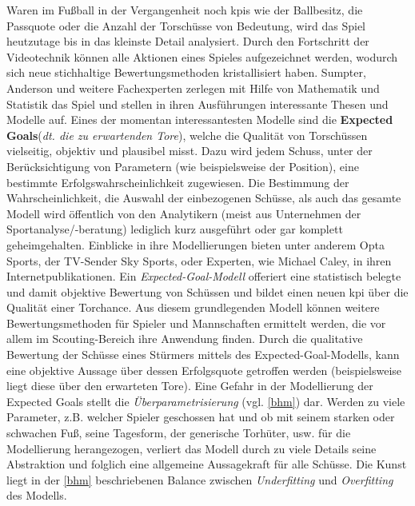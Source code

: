 Waren im Fußball in der Vergangenheit noch \glspl{kpi} wie der Ballbesitz, die Passquote oder die Anzahl der Torschüsse von Bedeutung, wird das Spiel heutzutage bis in das kleinste Detail analysiert. Durch den Fortschritt der Videotechnik können alle Aktionen eines Spieles aufgezeichnet werden, wodurch sich neue stichhaltige Bewertungsmethoden kristallisiert haben. Sumpter, Anderson und weitere Fachexperten zerlegen mit Hilfe von Mathematik und Statistik das Spiel und stellen in ihren Ausführungen interessante Thesen und Modelle auf. Eines der momentan interessantesten Modelle sind die \glqq \textbf{Expected Goals}\grqq (\textit{dt. die zu erwartenden Tore}), welche die Qualität von Torschüssen vielseitig, objektiv und plausibel misst. Dazu wird jedem Schuss, unter der Berücksichtigung von Parametern (wie beispielsweise der Position), eine bestimmte Erfolgswahrscheinlichkeit zugewiesen. Die Bestimmung der Wahrscheinlichkeit, die Auswahl der einbezogenen Schüsse, als auch das gesamte Modell wird öffentlich von den Analytikern (meist aus Unternehmen der Sportanalyse/-beratung) lediglich kurz ausgeführt oder gar komplett geheimgehalten. Einblicke in ihre Modellierungen bieten unter anderem Opta Sports, der TV-Sender Sky Sports, oder Experten, wie Michael Caley, in ihren Internetpublikationen. Ein \textit{Expected-Goal-Modell} offeriert eine statistisch belegte und damit objektive Bewertung von Schüssen und bildet einen neuen \gls{kpi} über die Qualität einer Torchance. Aus diesem grundlegenden Modell können weitere Bewertungsmethoden für Spieler und Mannschaften ermittelt werden, die vor allem im Scouting-Bereich ihre Anwendung finden. Durch die qualitative Bewertung der Schüsse eines Stürmers mittels des Expected-Goal-Modells, kann eine objektive Aussage über dessen Erfolgsquote getroffen werden (beispielsweise liegt diese über den erwarteten Tore). Eine Gefahr in der Modellierung der Expected Goals stellt die \textit{Überparametrisierung} (vgl. \vref{bhm}) dar. Werden zu viele Parameter, z.B. welcher Spieler geschossen hat und ob mit seinem starken oder schwachen Fuß, seine Tagesform, der generische Torhüter, usw. für die Modellierung herangezogen, verliert das Modell durch zu viele Details seine Abstraktion und folglich eine allgemeine Aussagekraft für alle Schüsse. Die Kunst liegt in der \vref{bhm} beschriebenen Balance zwischen \textit{Underfitting} und \textit{Overfitting} des Modells.

